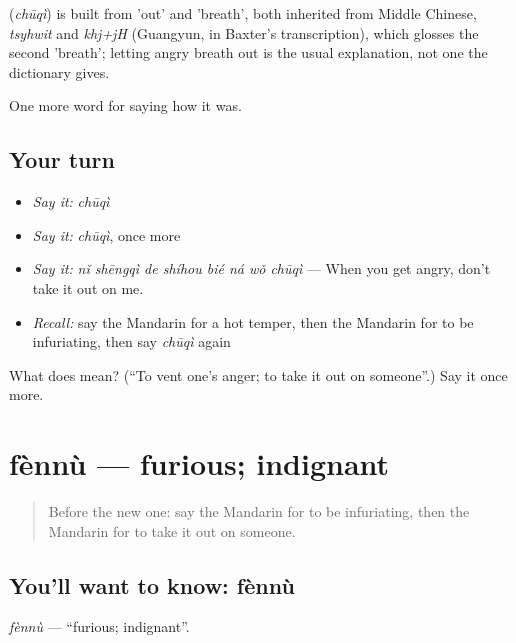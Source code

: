 \begin{cousinweb}
\textbf{} (\emph{chūqì}) is built from  'out' and  'breath', both inherited from Middle Chinese, \emph{tsyhwit} and \emph{khj+jH} (Guangyun, in Baxter's transcription), which glosses the second 'breath'; letting angry breath out is the usual explanation, not one the dictionary gives.
\end{cousinweb}

\begin{grammarlens}[title={What you've built}]
One more word for saying how it was.
\end{grammarlens}

\subsection*{Your turn}
\begin{itemize}
\raggedright
  \item \emph{Say it:} \emph{chūqì}
  \item \emph{Say it:} \emph{chūqì}, once more
  \item \emph{Say it:} \emph{nǐ shēngqì de shíhou bié ná wǒ chūqì} — When you get angry, don't take it out on me.
  \item \emph{Recall:} say the Mandarin for a hot temper, then the Mandarin for to be infuriating, then say \emph{chūqì} again
\end{itemize}

\begin{tcolorbox}[breakable,colback=teal!4,colframe=teal!35!black,title={Before you move on}]
What does  mean? (\textquotedblleft{}To vent one's anger; to take it out on someone\textquotedblright{}.) Say it once more.
\end{tcolorbox}
\section[fènnù]{fènnù — furious; indignant}

\label{lesson:ZH-C464-fennu}



\begin{quote}
Before the new one: say the Mandarin for to be infuriating, then the Mandarin for to take it out on someone.
\end{quote}

\subsection*{You'll want to know: fènnù}
\emph{fènnù} — \textquotedblleft{}furious; indignant\textquotedblright{}.

